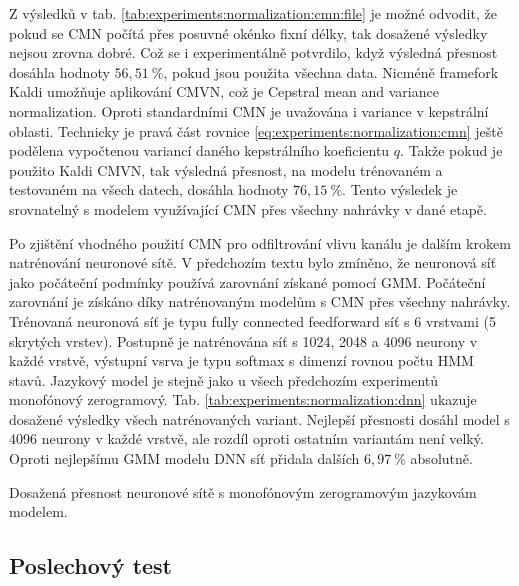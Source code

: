 Z výsledků v tab. \ref{tab:experiments:normalization:cmn:file} je možné odvodit, že pokud se CMN počítá přes posuvné okénko fixní délky, tak dosažené výsledky nejsou zrovna dobré. Což se i experimentálně potvrdilo, když výsledná přesnost dosáhla hodnoty $56,51\ \%$, pokud jsou použita všechna data. Nicméně framefork Kaldi umožňuje aplikování CMVN, což je Cepstral mean and variance normalization. Oproti standardními CMN je uvažována i variance v kepstrální oblasti. Technicky je pravá část rovnice \ref{eq:experiments:normalization:cmn} ještě podělena vypočtenou variancí daného kepstrálního koeficientu $q$. Takže pokud je použito Kaldi CMVN, tak výsledná přesnost, na modelu trénovaném a testovaném na všech datech, dosáhla hodnoty $76,15\ \%$. Tento výsledek je srovnatelný s modelem využívající CMN přes všechny nahrávky v dané etapě.

Po zjištění vhodného použití CMN pro odfiltrování vlivu kanálu je dalším krokem natrénování neuronové sítě. V předchozím textu bylo zmíněno, že neuronová síť jako počáteční podmínky používá zarovnání získané pomocí GMM. Počáteční zarovnání je získáno díky natrénovaným modelům s CMN přes všechny nahrávky. Trénovaná neuronová síť je typu fully connected feedforward síť s 6 vrstvami (5 skrytých vrstev). Postupně je natrénována síť s 1024, 2048 a 4096 neurony v každé vrstvě, výstupní vsrva je typu softmax s dimenzí rovnou počtu HMM stavů. Jazykový model je stejně jako u všech předchozím experimentů monofónový zerogramový. Tab. \ref{tab:experiments:normalization:dnn} ukazuje dosažené výsledky všech natrénovaných variant. Nejlepší přesnosti dosáhl model s 4096 neurony v každé vrstvě, ale rozdíl oproti ostatním variantám není velký. Oproti nejlepšímu GMM modelu DNN síť přidala dalších $6,97\ \%$ absolutně.

\begin{table}[htpb]
  \centering
  \def\arraystretch{1.5}
  \caption{Dosažená přesnost neuronové sítě s monofónovým zerogramovým jazykovám modelem.}
  \label{tab:experiments:normalization:dnn}
\end{table}

\subsection{Poslechový test}
\label{chap:experiments:normalization:listening}

